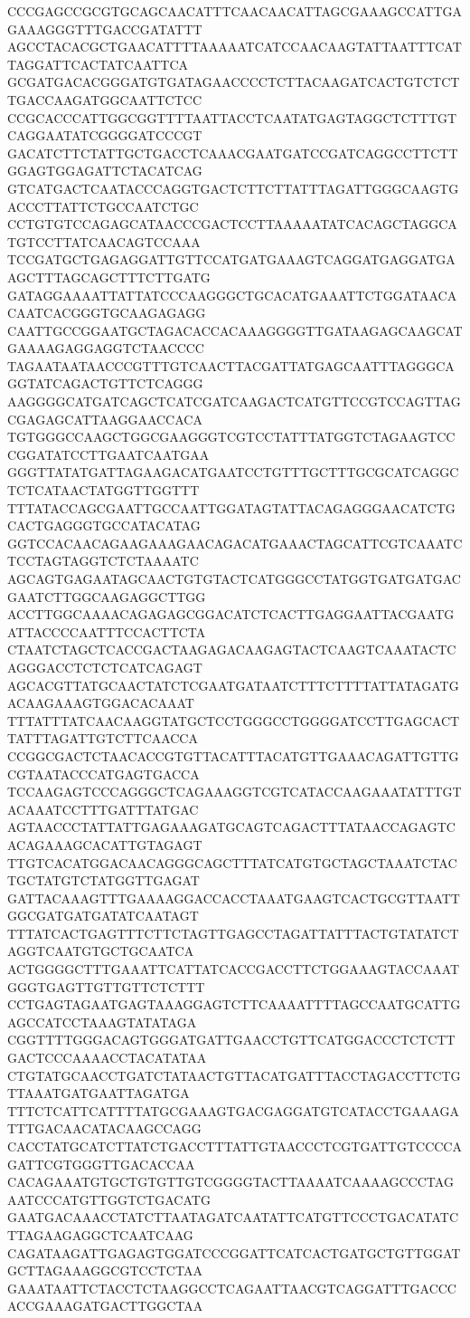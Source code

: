 CCCGAGCCGCGTGCAGCAACATTTCAACAACATTAGCGAAAGCCATTGAGAAAGGGTTTGACCGATATTT
AGCCTACACGCTGAACATTTTAAAAATCATCCAACAAGTATTAATTTCATTAGGATTCACTATCAATTCA
GCGATGACACGGGATGTGATAGAACCCCTCTTACAAGATCACTGTCTCTTGACCAAGATGGCAATTCTCC
CCGCACCCATTGGCGGTTTTAATTACCTCAATATGAGTAGGCTCTTTGTCAGGAATATCGGGGATCCCGT
GACATCTTCTATTGCTGACCTCAAACGAATGATCCGATCAGGCCTTCTTGGAGTGGAGATTCTACATCAG
GTCATGACTCAATACCCAGGTGACTCTTCTTATTTAGATTGGGCAAGTGACCCTTATTCTGCCAATCTGC
CCTGTGTCCAGAGCATAACCCGACTCCTTAAAAATATCACAGCTAGGCATGTCCTTATCAACAGTCCAAA
TCCGATGCTGAGAGGATTGTTCCATGATGAAAGTCAGGATGAGGATGAAGCTTTAGCAGCTTTCTTGATG
GATAGGAAAATTATTATCCCAAGGGCTGCACATGAAATTCTGGATAACACAATCACGGGTGCAAGAGAGG
CAATTGCCGGAATGCTAGACACCACAAAGGGGTTGATAAGAGCAAGCATGAAAAGAGGAGGTCTAACCCC
TAGAATAATAACCCGTTTGTCAACTTACGATTATGAGCAATTTAGGGCAGGTATCAGACTGTTCTCAGGG
AAGGGGCATGATCAGCTCATCGATCAAGACTCATGTTCCGTCCAGTTAGCGAGAGCATTAAGGAACCACA
TGTGGGCCAAGCTGGCGAAGGGTCGTCCTATTTATGGTCTAGAAGTCCCGGATATCCTTGAATCAATGAA
GGGTTATATGATTAGAAGACATGAATCCTGTTTGCTTTGCGCATCAGGCTCTCATAACTATGGTTGGTTT
TTTATACCAGCGAATTGCCAATTGGATAGTATTACAGAGGGAACATCTGCACTGAGGGTGCCATACATAG
GGTCCACAACAGAAGAAAGAACAGACATGAAACTAGCATTCGTCAAATCTCCTAGTAGGTCTCTAAAATC
AGCAGTGAGAATAGCAACTGTGTACTCATGGGCCTATGGTGATGATGACGAATCTTGGCAAGAGGCTTGG
ACCTTGGCAAAACAGAGAGCGGACATCTCACTTGAGGAATTACGAATGATTACCCCAATTTCCACTTCTA
CTAATCTAGCTCACCGACTAAGAGACAAGAGTACTCAAGTCAAATACTCAGGGACCTCTCTCATCAGAGT
AGCACGTTATGCAACTATCTCGAATGATAATCTTTCTTTTATTATAGATGACAAGAAAGTGGACACAAAT
TTTATTTATCAACAAGGTATGCTCCTGGGCCTGGGGATCCTTGAGCACTTATTTAGATTGTCTTCAACCA
CCGGCGACTCTAACACCGTGTTACATTTACATGTTGAAACAGATTGTTGCGTAATACCCATGAGTGACCA
TCCAAGAGTCCCAGGGCTCAGAAAGGTCGTCATACCAAGAAATATTTGTACAAATCCTTTGATTTATGAC
AGTAACCCTATTATTGAGAAAGATGCAGTCAGACTTTATAACCAGAGTCACAGAAAGCACATTGTAGAGT
TTGTCACATGGACAACAGGGCAGCTTTATCATGTGCTAGCTAAATCTACTGCTATGTCTATGGTTGAGAT
GATTACAAAGTTTGAAAAGGACCACCTAAATGAAGTCACTGCGTTAATTGGCGATGATGATATCAATAGT
TTTATCACTGAGTTTCTTCTAGTTGAGCCTAGATTATTTACTGTATATCTAGGTCAATGTGCTGCAATCA
ACTGGGGCTTTGAAATTCATTATCACCGACCTTCTGGAAAGTACCAAATGGGTGAGTTGTTGTTCTCTTT
CCTGAGTAGAATGAGTAAAGGAGTCTTCAAAATTTTAGCCAATGCATTGAGCCATCCTAAAGTATATAGA
CGGTTTTGGGACAGTGGGATGATTGAACCTGTTCATGGACCCTCTCTTGACTCCCAAAACCTACATATAA
CTGTATGCAACCTGATCTATAACTGTTACATGATTTACCTAGACCTTCTGTTAAATGATGAATTAGATGA
TTTCTCATTCATTTTATGCGAAAGTGACGAGGATGTCATACCTGAAAGATTTGACAACATACAAGCCAGG
CACCTATGCATCTTATCTGACCTTTATTGTAACCCTCGTGATTGTCCCCAGATTCGTGGGTTGACACCAA
CACAGAAATGTGCTGTGTTGTCGGGGTACTTAAAATCAAAAGCCCTAGAATCCCATGTTGGTCTGACATG
GAATGACAAACCTATCTTAATAGATCAATATTCATGTTCCCTGACATATCTTAGAAGAGGCTCAATCAAG
CAGATAAGATTGAGAGTGGATCCCGGATTCATCACTGATGCTGTTGGATGCTTAGAAAGGCGTCCTCTAA
GAAATAATTCTACCTCTAAGGCCTCAGAATTAACGTCAGGATTTGACCCACCGAAAGATGACTTGGCTAA
